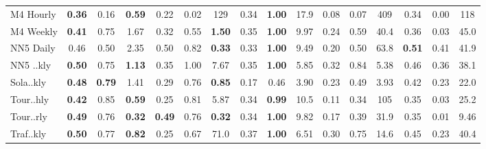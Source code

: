 \begin{tabular}{l|ccc|ccc|ccc|ccc|ccc}
        M4 Hourly & \textbf{0.36} & 0.16 & \textbf{0.59} & 0.22 & 0.02 & 129 & 0.34 & \textbf{1.00} & 17.9 & 0.08 & 0.07 & 409 & 0.34 & 0.00 & 118 \\
        M4 Weekly & \textbf{0.41} & 0.75 & 1.67 & 0.32 & 0.55 & \textbf{1.50} & 0.35 & \textbf{1.00} & 9.97 & 0.24 & 0.59 & 40.4 & 0.36 & 0.03 & 45.0 \\
        NN5 Daily & 0.46 & 0.50 & 2.35 & 0.50 & 0.82 & \textbf{0.33} & 0.33 & \textbf{1.00} & 9.49 & 0.20 & 0.50 & 63.8 & \textbf{0.51} & 0.41 & 41.9 \\
        NN5 ..kly & \textbf{0.50} & 0.75 & \textbf{1.13} & 0.35 & 1.00 & 7.67 & 0.35 & \textbf{1.00} & 5.85 & 0.32 & 0.84 & 5.38 & 0.46 & 0.36 & 38.1 \\
        Sola..kly & \textbf{0.48} & \textbf{0.79} & 1.41 & 0.29 & 0.76 & \textbf{0.85} & 0.17 & 0.46 & 3.90 & 0.23 & 0.49 & 3.93 & 0.42 & 0.23 & 22.0 \\
        Tour..hly & \textbf{0.42} & 0.85 & \textbf{0.59} & 0.25 & 0.81 & 5.87 & 0.34 & \textbf{0.99} & 10.5 & 0.11 & 0.34 & 105 & 0.35 & 0.03 & 25.2 \\
        Tour..rly & \textbf{0.49} & 0.76 & \textbf{0.32} & \textbf{0.49} & 0.76 & \textbf{0.32} & 0.34 & \textbf{1.00} & 9.82 & 0.17 & 0.39 & 31.9 & 0.35 & 0.01 & 9.46 \\
        Traf..kly & \textbf{0.50} & 0.77 & \textbf{0.82} & 0.25 & 0.67 & 71.0 & 0.37 & \textbf{1.00} & 6.51 & 0.30 & 0.75 & 14.6 & 0.45 & 0.23 & 40.4 \\
        \bottomrule
    \end{tabular}
